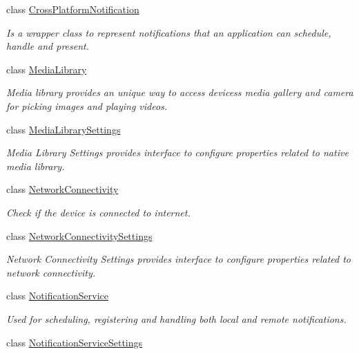 \begin{DoxyCompactItemize}
class \hyperlink{class_voxel_busters_1_1_native_plugins_1_1_cross_platform_notification}{Cross\+Platform\+Notification}
\begin{DoxyCompactList}\small\item\em Is a wrapper class to represent notifications that an application can schedule, handle and present. \end{DoxyCompactList}\item 
class \hyperlink{class_voxel_busters_1_1_native_plugins_1_1_media_library}{Media\+Library}
\begin{DoxyCompactList}\small\item\em Media library provides an unique way to access devices\textquotesingle{}s media gallery and camera for picking images and playing videos. \end{DoxyCompactList}\item 
class \hyperlink{class_voxel_busters_1_1_native_plugins_1_1_media_library_settings}{Media\+Library\+Settings}
\begin{DoxyCompactList}\small\item\em Media Library Settings provides interface to configure properties related to native media library. \end{DoxyCompactList}\item 
class \hyperlink{class_voxel_busters_1_1_native_plugins_1_1_network_connectivity}{Network\+Connectivity}
\begin{DoxyCompactList}\small\item\em Check if the device is connected to internet. \end{DoxyCompactList}\item 
class \hyperlink{class_voxel_busters_1_1_native_plugins_1_1_network_connectivity_settings}{Network\+Connectivity\+Settings}
\begin{DoxyCompactList}\small\item\em Network Connectivity Settings provides interface to configure properties related to network connectivity. \end{DoxyCompactList}\item 
class \hyperlink{class_voxel_busters_1_1_native_plugins_1_1_notification_service}{Notification\+Service}
\begin{DoxyCompactList}\small\item\em Used for scheduling, registering and handling both local and remote notifications. \end{DoxyCompactList}\item 
class \hyperlink{class_voxel_busters_1_1_native_plugins_1_1_notification_service_settings}{Notification\+Service\+Settings}

\end{DoxyCompactItemize}
